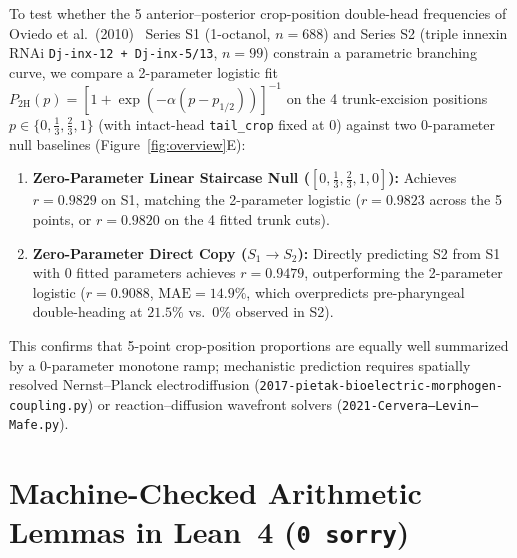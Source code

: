 \documentclass[11pt,a4paper]{article}
\theoremstyle{definition}
\theoremstyle{remark}
\begin{document}
To test whether the 5 anterior--posterior crop-position double-head frequencies of Oviedo et al.\ (2010)~\cite{Oviedo2010} Series S1 (1-octanol, $n=688$) and Series S2 (triple innexin RNAi \texttt{Dj-inx-12 + Dj-inx-5/13}, $n=99$) constrain a parametric branching curve, we compare a 2-parameter logistic fit $P_{2\text{H}}(p) = [1 + \exp(-\alpha(p - p_{1/2}))]^{-1}$ on the 4 trunk-excision positions $p \in \{0, \tfrac{1}{3}, \tfrac{2}{3}, 1\}$ (with intact-head \texttt{tail\_crop} fixed at $0$) against two 0-parameter null baselines (Figure~\ref{fig:overview}E):
\begin{enumerate}
  \item \textbf{Zero-Parameter Linear Staircase Null ($[0, \tfrac{1}{3}, \tfrac{2}{3}, 1, 0]$):} Achieves $r = 0.9829$ on S1, matching the 2-parameter logistic ($r = 0.9823$ across the 5 points, or $r = 0.9820$ on the 4 fitted trunk cuts).
  \item \textbf{Zero-Parameter Direct Copy ($S_1 \to S_2$):} Directly predicting S2 from S1 with 0 fitted parameters achieves $r = 0.9479$, outperforming the 2-parameter logistic ($r = 0.9088$, $\text{MAE} = 14.9\%$, which overpredicts pre-pharyngeal double-heading at $21.5\%$ vs.\ $0\%$ observed in S2).
\end{enumerate}
This confirms that 5-point crop-position proportions are equally well summarized by a 0-parameter monotone ramp; mechanistic prediction requires spatially resolved Nernst--Planck electrodiffusion (\texttt{2017-pietak-bioelectric-morphogen-coupling.py}) or reaction--diffusion wavefront solvers (\texttt{2021-Cervera--Levin--Mafe.py}).

\section{Machine-Checked Arithmetic Lemmas in Lean~4 (\texttt{0 sorry})}
\end{document}
